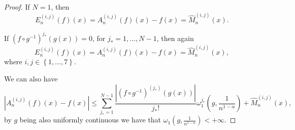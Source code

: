 \documentclass[10pt]{NSP1}
\numberwithin{equation}{section}
\begin{document}
\begin{proof}
If $N=1$, then
\begin{equation}
E_{n}^{\left( i,j\right) }\left( f\right) \left( x\right) =A_{n}^{\left(
i,j\right) }\left( f\right) \left( x\right) -f\left( x\right) =\widehat{M}%
_{n}^{\left( i,j\right) }\left( x\right) .  \tag{39}  \label{39}
\end{equation}

If $\left( f\circ g^{-1}\right) ^{j_{\ast }}\left( g\left( x\right) \right)
=0$, for $j_{\ast }=1,...,N-1$, then again
\begin{equation}
E_{n}^{\left( i,j\right) }\left( f\right) \left( x\right) =A_{n}^{\left(
i,j\right) }\left( f\right) \left( x\right) -f\left( x\right) =\widehat{M}%
_{n}^{\left( i,j\right) }\left( x\right) ,  \tag{40}  \label{40}
\end{equation}
where $i,j\in \left \{ 1,...,7\right \} .$

We can also have
\begin{equation}
\left \vert A_{n}^{\left( i,j\right) }\left( f\right) \left( x\right)
-f\left( x\right) \right \vert \leq \sum_{j_{\ast }=1}^{N-1}\frac{\left
\vert \left( f\circ g^{-1}\right) ^{\left( j_{\ast }\right) }\left( g\left(
x\right) \right) \right \vert }{j_{\ast }!}\omega _{1}^{j_{\ast }}\left( g,%
\frac{1}{n^{1-\alpha }}\right) +\widehat{M}_{n}^{\left( i,j\right) }\left(
x\right) ,  \tag{41}  \label{41}
\end{equation}
by $g$ being also uniformly continuous we have that $\omega _{1}\left( g,%
\frac{1}{n^{1-\alpha }}\right) <+\infty .$


\end{proof}
\end{document}
